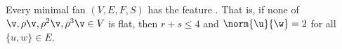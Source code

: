 %
%
%



\begin{lemma}[]\label{lemma:flat-exists}
Every minimal fan $(V,E,F,S)$ has the feature .
  That is, if none of $\v,\rho
\v,\rho^2 \v,\rho^3 \v\in V$ is flat, then $r+s\le 4$ and
$\norm{\u}{\w}=2$ for all $\{u,w\}\in E$.
\end{lemma}

